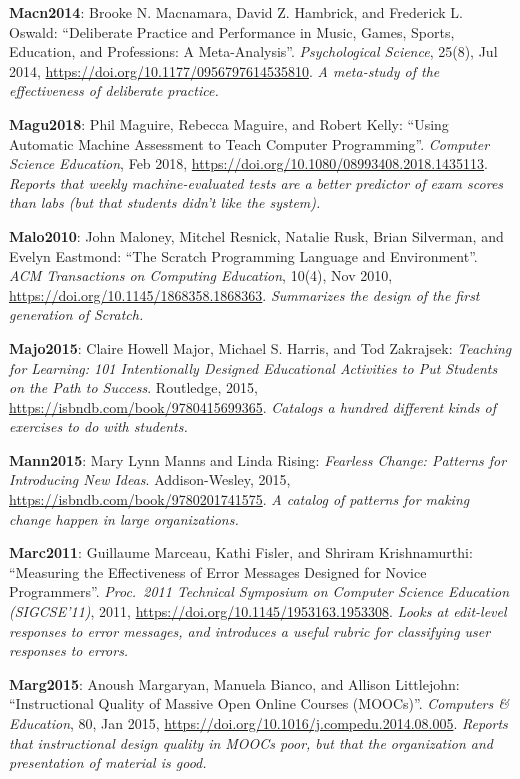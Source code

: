 \textbf{\hypertarget{b:Macn2014}{Macn2014}\label{b:Macn2014}}: Brooke N. Macnamara, David Z. Hambrick, and Frederick L. Oswald: ``Deliberate Practice and Performance in Music, Games, Sports, Education, and Professions: A Meta-Analysis''. \emph{Psychological Science}, 25(8), Jul 2014, \url{https://doi.org/10.1177/0956797614535810}. \emph{A meta-study of the effectiveness of deliberate practice.}

\textbf{\hypertarget{b:Magu2018}{Magu2018}\label{b:Magu2018}}: Phil Maguire, Rebecca Maguire, and Robert Kelly: ``Using Automatic Machine Assessment to Teach Computer Programming''. \emph{Computer Science Education}, Feb 2018, \url{https://doi.org/10.1080/08993408.2018.1435113}. \emph{Reports that weekly machine-evaluated tests are a better predictor of exam scores than labs (but that students didn't like the system).}

\textbf{\hypertarget{b:Malo2010}{Malo2010}\label{b:Malo2010}}: John Maloney, Mitchel Resnick, Natalie Rusk, Brian Silverman, and Evelyn Eastmond: ``The Scratch Programming Language and Environment''. \emph{ACM Transactions on Computing Education}, 10(4), Nov 2010, \url{https://doi.org/10.1145/1868358.1868363}. \emph{Summarizes the design of the first generation of Scratch.}

\textbf{\hypertarget{b:Majo2015}{Majo2015}\label{b:Majo2015}}: Claire Howell Major, Michael S. Harris, and Tod Zakrajsek: \emph{Teaching for Learning: 101 Intentionally Designed Educational Activities to Put Students on the Path to Success}. Routledge, 2015, \url{https://isbndb.com/book/9780415699365}. \emph{Catalogs a hundred different kinds of exercises to do with students.}

\textbf{\hypertarget{b:Mann2015}{Mann2015}\label{b:Mann2015}}: Mary Lynn Manns and Linda Rising: \emph{Fearless Change: Patterns for Introducing New Ideas}. Addison-Wesley, 2015, \url{https://isbndb.com/book/9780201741575}. \emph{A catalog of patterns for making change happen in large organizations.}

\textbf{\hypertarget{b:Marc2011}{Marc2011}\label{b:Marc2011}}: Guillaume Marceau, Kathi Fisler, and Shriram Krishnamurthi: ``Measuring the Effectiveness of Error Messages Designed for Novice Programmers''. \emph{Proc.\ 2011 Technical Symposium on Computer Science Education (SIGCSE'11)}, 2011, \url{https://doi.org/10.1145/1953163.1953308}. \emph{Looks at edit-level responses to error messages, and introduces a useful rubric for classifying user responses to errors.}

\textbf{\hypertarget{b:Marg2015}{Marg2015}\label{b:Marg2015}}: Anoush Margaryan, Manuela Bianco, and Allison Littlejohn: ``Instructional Quality of Massive Open Online Courses (MOOCs)''. \emph{Computers \& Education}, 80, Jan 2015, \url{https://doi.org/10.1016/j.compedu.2014.08.005}. \emph{Reports that instructional design quality in MOOCs poor, but that the organization and presentation of material is good.}

